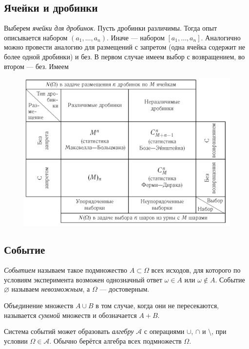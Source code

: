 \subsection{Ячейки и дробинки}
Выберем \emph{ячейки для дробинок}.
Пусть дробинки различимы. Тогда опыт описывается набором $ (a_1, \ldots, a_n) $.
Иначе --- набором $ [a_1, \ldots, a_n] $. Аналогично можно провести аналогию для
размещений с запретом (одна ячейка содержит не более одной дробинки) и без. В
первом случае имеем выбор с возвращением, во втором --- без. Имеем 
\begin{figure}[h!]
\begin{center}
\includegraphics[width= \textwidth]{Figures/drob.png}
\end{center}
\label{fig:drob}
\end{figure}


\subsection{Событие}
\begin{definition}
	\emph{Событием} называем такое подмножество $ A \subset \Omega$ всех исходов,
	для которого по условиям эксперимента возможен однозначный ответ $ \omega \in
	A$ или $ \omega \notin A $. Событие $ \varnothing $ называем
	\emph{невозможным}, а $ \Omega $ --- достоверным.
\end{definition}

Объединение множеств $ A \cup B $ в том случае, когда они не пересекаются,
называется \emph{суммой} множеств и обозначается $ A + B $.

Система событий может образовать \emph{алгебру} $ \mathscr A $ с операциями $ \cup $, $ \cap $
и $ \setminus $, при условии $ \Omega \in \mathscr A $. Обычно берётся алгебра
всех подмножеств $ \Omega $.

